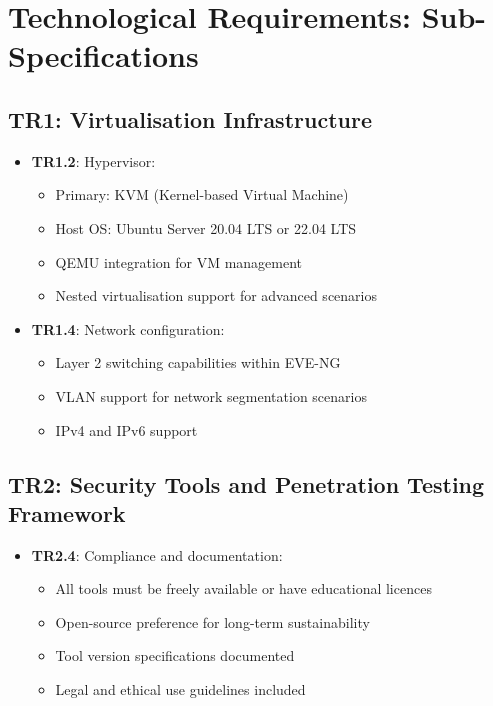 \section{Technological Requirements: Sub-Specifications}

\subsection{TR1: Virtualisation Infrastructure}

\begin{itemize}

\item \textbf{TR1.2}: Hypervisor:
\begin{itemize}
\item Primary: KVM (Kernel-based Virtual Machine)
\item Host OS: Ubuntu Server 20.04 LTS or 22.04 LTS
\item QEMU integration for VM management
\item Nested virtualisation support for advanced scenarios
\end{itemize}

\item \textbf{TR1.4}: Network configuration:
\begin{itemize}
\item Layer 2 switching capabilities within EVE-NG
\item VLAN support for network segmentation scenarios
\item IPv4 and IPv6 support
\end{itemize}

\end{itemize}

\subsection{TR2: Security Tools and Penetration Testing Framework}

\begin{itemize}

\item \textbf{TR2.4}: Compliance and documentation:
\begin{itemize}
\item All tools must be freely available or have educational licences
\item Open-source preference for long-term sustainability
\item Tool version specifications documented
\item Legal and ethical use guidelines included
\end{itemize}

\end{itemize}

